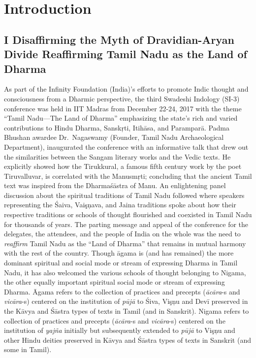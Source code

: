 
\chapter{Introduction}



\section*{I Disaffirming the Myth of Dravidian-Aryan Divide Reaffirming Tamil Nadu as the Land of Dharma}

\vskip 7pt

As part of the Infinity Foundation (India)’s efforts to promote Indic thought and consciousness from a Dharmic perspective, the third Swadeshi Indology (SI-3) conference was held in IIT Madras from December 22-24, 2017 with the theme “Tamil Nadu—The Land of Dharma” emphasizing the state’s rich and varied contributions to Hindu Dharma, Sanskŗti, Itihāsa, and Paramparā. Padma Bhushan awardee Dr.\ Nagaswamy (Founder, Tamil Nadu Archaeological Department), inaugurated the conference with an informative talk that drew out the similarities between the Sangam literary works and the Vedic texts. He explicitly showed how the Tirukkural, a famous fifth century work by the poet Tiruvalluvar, is correlated with the Manusmŗti; concluding that the ancient Tamil text was inspired from the Dharmaśāstra of Manu. An enlightening panel discussion about the spiritual traditions of Tamil Nadu followed where speakers representing the Śaiva, Vaişņava, and Jaina traditions spoke about how their respective traditions or schools of thought flourished and coexisted in Tamil Nadu for thousands of years. The parting message and appeal of the conference for the delegates, the attendees, and the people of India on the whole was the need to \textit{reaffirm} Tamil Nadu as the “Land of Dharma” that remains in mutual harmony with the rest of the country. Though āgama is (and has remained) the more dominant spiritual and social mode or stream of expressing Dharma in Tamil Nadu, it has also welcomed the various schools of thought belonging to Nigama, the other equally important spiritual social mode or stream of expressing Dharma. Āgama refers to the collection of practices and precepts (\textit{ācāra}-s and \textit{vicāra}-s) centered on the institution of \textit{pūjā} to Śiva, Vişņu and Devī preserved in the Kāvya and Śāstra types of texts in Tamil (and in Sanskrit). Nigama refers to collection of practices and precepts (\textit{ācāra}-s and \textit{vicāra}-s) centered on the institution of \textit{yajña} initially but subsequently extended to \textit{pūjā} to Vişņu and other Hindu deities preserved in Kāvya and Śāstra types of texts in Sanskrit (and some in Tamil).


